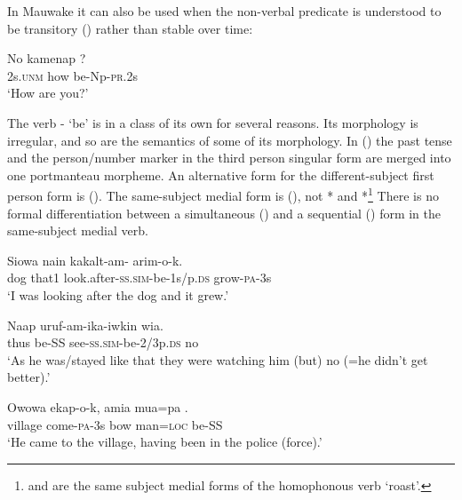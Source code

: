 In Mauwake it can also be used when the non-verbal predicate is understood to be transitory () rather than stable over time:

\ea%
\label{ex:x499}
\gll No kamenap ? \\
2s.\textsc{unm} how be-Np-\textsc{pr}.2s\\
\glt`How are you?' 
\z

The verb - `be' is in a class of its own for several reasons. Its morphology is irregular, and so are the semantics of some of its morphology. In () the past tense and the person/number marker in the third person singular form are merged into one portmanteau morpheme. An alternative form for the different-subject first person form  is  (). The same-subject medial form is  (), not * and *\footnote{ and  are the same subject medial forms of the homophonous verb  `roast'.} There is no formal differentiation between a simultaneous () and a sequential () form in the same-subject medial verb. 

\ea%
\label{ex:x1931}
\gll Siowa nain kakalt-am-\textstyleEmphasizedVernacularWords{-} arim-o-k. \\
dog that1 look.after-\textsc{ss}.\textsc{sim}-be-1s/p.\textsc{ds} grow-\textsc{pa}-3s\\
\glt`I was looking after the dog and it grew.'
\z

\ea%
\label{ex:x260}
\gll Naap  uruf-am-ika-iwkin wia. \\
thus be-SS see-\textsc{ss}.\textsc{sim}-be-2/3p.\textsc{ds} no\\
\glt`As he was/stayed like that they were watching him (but) no (=he didn't get better).' 
\z

\ea%
\label{ex:x262}
\gll Owowa ekap-o-k, amia mua=pa . \\
village come-\textsc{pa}-3s bow man=\textsc{loc} be-SS \\
\glt`He came to the village, having been in the police (force).'
\z

